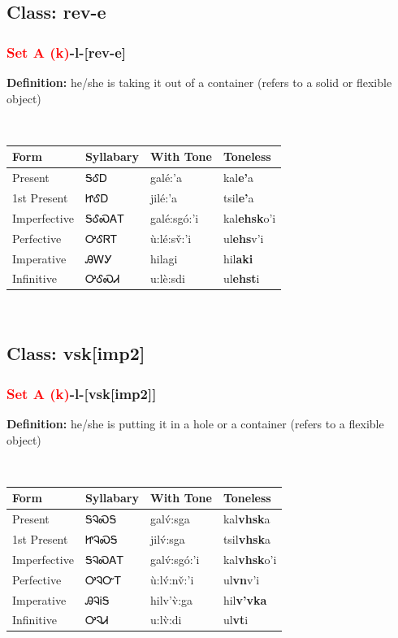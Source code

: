 \subsection*{Class: rev-e}
\nopagebreak
\needspace{2in}
\subsubsection*{\textcolor{Red}{Set A (k)}{-}\textbf{l}{-}[rev-e]}
\nopagebreak
\textbf{Definition: } he/she is taking it out of a container (refers to a solid or flexible object)
\\[0.5em]
\begin{tabularx}{\textwidth}{l X X X}%
\toprule%
\textbf{Form}&\textbf{Syllabary}&\textbf{With Tone}&\textbf{Toneless}\\%
\midrule%
Present&ᎦᎴᎠ&galé:’a&kal\textbf{e'}a\\%
1st Present&ᏥᎴᎠ&jilé:’a&tsil\textbf{e'}a\\%
Imperfective&ᎦᎴᏍᎪᎢ&galé:sgó:’i&kal\textbf{ehsk}o'i\\%
Perfective&ᎤᎴᏒᎢ&ù:lé:sv̌:’i&ul\textbf{ehs}v'i\\%
Imperative&ᎯᎳᎩ&hilagi&hil\textbf{aki}\\%
Infinitive&ᎤᎴᏍᏗ&u:lè:sdi&ul\textbf{ehst}i\\%
\bottomrule%
\end{tabularx}
\\[1em]
\needspace{3in}
\subsection*{Class: vsk[imp2]}
\nopagebreak
\needspace{2in}
\subsubsection*{\textcolor{Red}{Set A (k)}{-}\textbf{l}{-}[vsk[imp2]]}
\nopagebreak
\textbf{Definition: } he/she is putting it in a hole or a container (refers to a flexible object)
\\[0.5em]
\begin{tabularx}{\textwidth}{l X X X}%
\toprule%
\textbf{Form}&\textbf{Syllabary}&\textbf{With Tone}&\textbf{Toneless}\\%
\midrule%
Present&ᎦᎸᏍᎦ&galv́:sga&kal\textbf{vhsk}a\\%
1st Present&ᏥᎸᏍᎦ&jilv́:sga&tsil\textbf{vhsk}a\\%
Imperfective&ᎦᎸᏍᎪᎢ&galv́:sgó:’i&kal\textbf{vhsk}o'i\\%
Perfective&ᎤᎸᏅᎢ&ù:lv́:nv̌:’i&ul\textbf{vn}v'i\\%
Imperative&ᎯᎸᎥᎦ&hilv’v̀:ga&hil\textbf{v'vka}\\%
Infinitive&ᎤᎸᏗ&u:lv̀:di&ul\textbf{vt}i\\%
\bottomrule%
\end{tabularx}
\\[1em]
